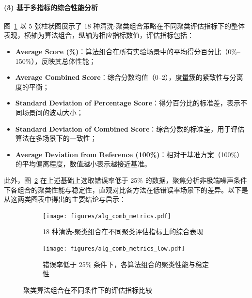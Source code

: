 \documentclass[10pt]{article} %
\numberwithin{equation}{section}
\begin{document}
\paragraph{(3) 基于多指标的综合性能分析}
图~\ref{fig:alg_comb_metrics} 以 5 张柱状图展示了 18 种清洗-聚类组合策略在不同聚类评估指标下的整体表现，横轴为算法组合，纵轴为相应指标数值，评估指标包括：
\begin{itemize}
    \item \textbf{Average Score (\%)}：算法组合在所有实验场景中的平均得分百分比（0\%--150\%），反映其总体性能；
    \item \textbf{Average Combined Score}：综合分数均值（0--2），度量簇的紧致性与分离度的平衡；
    \item \textbf{Standard Deviation of Percentage Score}：得分百分比的标准差，表示不同场景间的波动大小；
    \item \textbf{Standard Deviation of Combined Score}：综合分数的标准差，用于评估算法在多场景下的一致性；
    \item \textbf{Average Deviation from Reference (100\%)}：相对于基准方案（100\%）的平均偏离程度，数值越小表示越接近基准。
\end{itemize}

此外，图~\ref{fig:alg_comb_metrics_low} 在上述基础上选取错误率低于 25\% 的数据，聚焦分析非极端噪声条件下各组合的聚类性能与稳定性，直观对比各方法在低错误率场景下的差异。以下是从这两类图表中得出的主要结论与启示：

\begin{figure}[htbp]
    \centering
    \setlength{\abovecaptionskip}{5pt}  %
    \setlength{\belowcaptionskip}{5pt}  %

    \begin{subfigure}{1.0\linewidth}  %
        \centering
        \texttt{[image: figures/alg\_comb\_metrics.pdf]}
        \caption{18 种清洗-聚类组合在不同聚类评估指标上的综合表现}
        \label{fig:alg_comb_metrics}
    \end{subfigure}

    \vspace{1em}  %

    \begin{subfigure}{1.0\linewidth}  %
        \centering
        \texttt{[image: figures/alg\_comb\_metrics\_low.pdf]}
        \caption{错误率低于 25\% 条件下，各算法组合的聚类性能与稳定性}
        \label{fig:alg_comb_metrics_low}
    \end{subfigure}

    \caption{聚类算法组合在不同条件下的评估指标比较}
    \label{fig:alg_comb_metrics_comparison}
\end{figure}
\vspace{-10pt}
\end{document}

